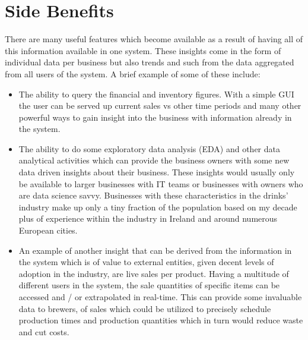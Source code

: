 \section{Side Benefits}
\label{subsec:side_benefits}
There are many useful features which become available as a result of having all of this information available in one system. These insights come in the form of individual data per
business but also trends and such from the data aggregated from all users of the system. A brief example of some of these include:
\begin{itemize}
	\item The ability to query the financial and inventory figures. With a simple GUI the user can be served up current sales vs other time periods and many other powerful ways to gain insight into
	      the business with information already in the system.
	\item The ability to do some exploratory data analysis (EDA) and other data analytical activities which can provide the business owners with some new data driven insights about their business.
	      These insights would usually only be available to larger businesses with IT teams or businesses with owners who are data science savvy. Businesses with these characteristics in the
	      drinks' industry make up only a tiny fraction of the population based on my decade plus of experience within the industry in Ireland and around numerous European cities.
	\item An example of another insight that can be derived from the information in the system which is of value to external entities, given decent levels of adoption in the industry,
	      are live sales per product.
	      Having a multitude of different users in the system, the sale quantities of specific items can be accessed and / or extrapolated in real-time. This can provide some invaluable
	      data to brewers, of sales which could be utilized to precisely schedule production times and production quantities which in turn would reduce waste 
		  and cut costs.
\end{itemize}

